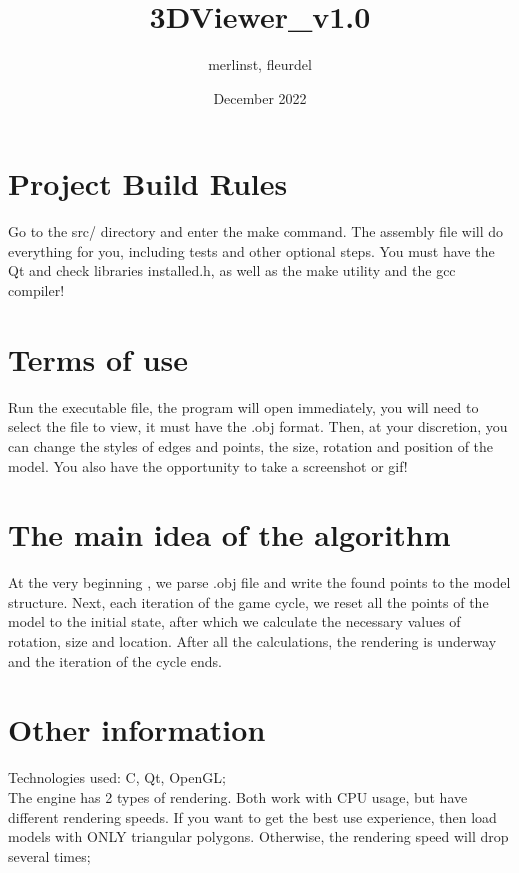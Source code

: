 \documentclass{article}
\title{3DViewer_v1.0}
\author{merlinst, fleurdel}
\date{December 2022}
\begin{document}
\maketitle{}

\section{Project Build Rules}
Go to the src/ directory and enter the make command. The assembly file will do everything for you, including tests and other optional steps. You must have the Qt and check libraries installed.h, as well as the make utility and the gcc compiler!

\section{Terms of use}
Run the executable file, the program will open immediately, you will need to select the file to view, it must have the .obj format. Then, at your discretion, you can change the styles of edges and points, the size, rotation and position of the model. You also have the opportunity to take a screenshot or gif!

\section{The main idea of the algorithm}
At the very beginning , we parse .obj file and write the found points to the model structure. Next, each iteration of the game cycle, we reset all the points of the model to the initial state, after which we calculate the necessary values of rotation, size and location. After all the calculations, the rendering is underway and the iteration of the cycle ends.

\section{Other information}
Technologies used: C, Qt, OpenGL;\\
The engine has 2 types of rendering. Both work with CPU usage, but have different rendering speeds. If you want to get the best use experience, then load models with ONLY triangular polygons. Otherwise, the rendering speed will drop several times;
\end{document}
